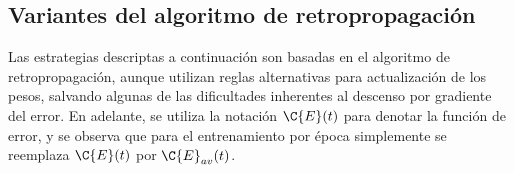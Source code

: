 %
\subsection{Variantes del algoritmo de retropropagación}
%
Las estrategias descriptas a continuación son basadas en el algoritmo
de retropropagación, aunque utilizan reglas alternativas para
actualización de los pesos, salvando algunas de las dificultades
inherentes al descenso por gradiente del error.  En adelante, se
utiliza la notación $\C{E}(t)$ para denotar la función de error, y se
observa que para el entrenamiento por época simplemente se reemplaza
$\C{E}(t)$ por $\C{E}_{av}(t)$.

